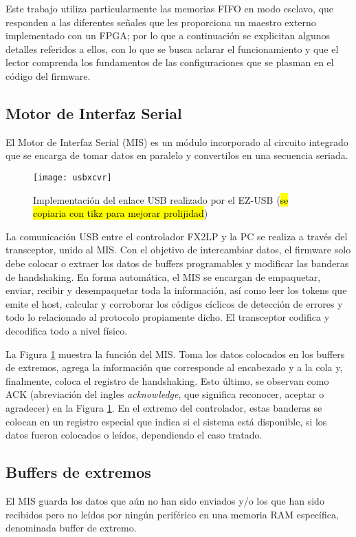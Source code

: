 Este trabajo utiliza particularmente las memorias FIFO en modo esclavo, que responden a las diferentes señales que les proporciona un maestro externo implementado con un FPGA; por lo que a continuación se explicitan algunos detalles referidos a ellos, con lo que se busca aclarar el funcionamiento y que el lector comprenda los fundamentos de las configuraciones que se plasman en el código del firmware.

\subsection{Motor de Interfaz Serial}
	El Motor de Interfaz Serial (MIS) es un módulo incorporado al circuito integrado que se encarga de tomar datos en paralelo y convertilos en una secuencia seriada.

	\begin{figure}[ht]%
		\centering
		\texttt{[image: usbxcvr]}
		\caption{Implementación del enlace USB realizado por el EZ-USB (\hl{se copiaria con tikz para mejorar prolijidad})}
		\label{usbxcvr}
	\end{figure}
	
	La comunicación USB entre el controlador FX2LP y la PC se realiza a través del transceptor, unido al MIS. Con el objetivo de intercambiar datos, el firmware solo debe colocar o extraer los datos de buffers programables y modificar las banderas de handshaking. En forma automática, el MIS se encargan de empaquetar, enviar, recibir y desempaquetar toda la información, así como leer los tokens que emite el host, calcular y corroborar los códigos cíclicos de detección de errores y todo lo relacionado al protocolo propiamente dicho. El transceptor codifica y decodifica todo a nivel físico.%
	
	La Figura \ref{usbxcvr} muestra la función del MIS. Toma los datos colocados en los buffers de extremos, agrega la información que corresponde al encabezado y a la cola y, finalmente, coloca el registro de handshaking. Esto último, se observan como ACK (abreviación del ingles {\it acknowledge}, que significa reconocer, aceptar o agradecer) en la Figura \ref{usbxcvr}. En el extremo del controlador, estas banderas se colocan en un registro especial que indica si el sistema está disponible, si los datos fueron colocados o leídos, dependiendo el caso tratado.
		
\subsection{Buffers de extremos}
	El MIS guarda los datos que aún no han sido enviados y/o los que han sido recibidos pero no leídos por ningún periférico en una memoria RAM específica, denominada buffer de extremo.%
	
